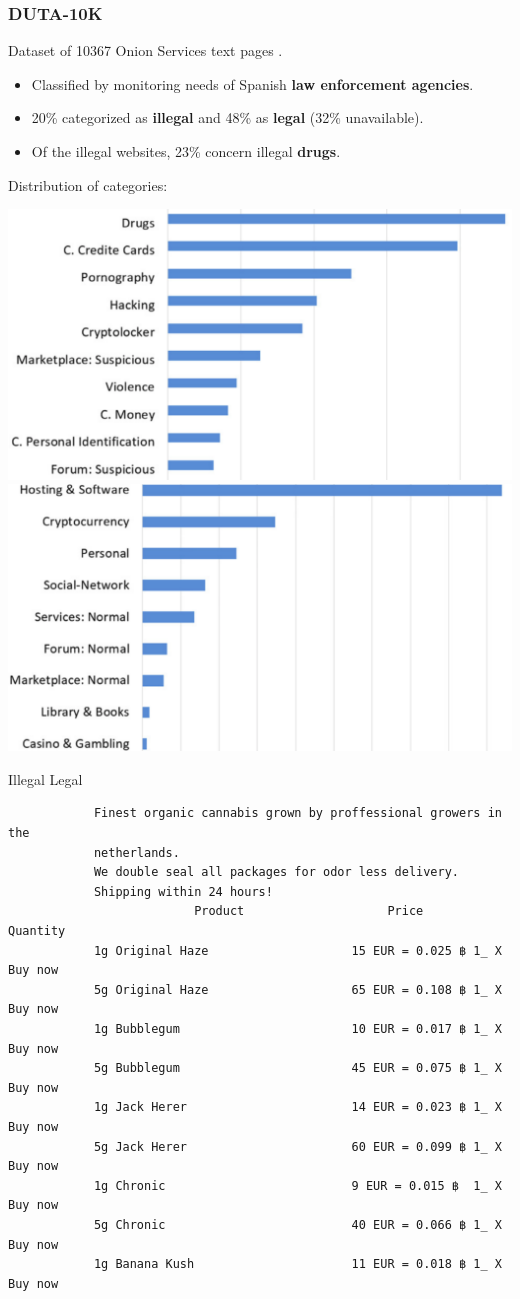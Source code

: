\documentclass[t,xcolor={svgnames,table}]{beamer}
\begin{document}
\begin{frame}
	\frametitle{DUTA-10K}
	
	Dataset of 10367 Onion Services text pages \cite{AlNabki19}.

	\begin{itemize}\setlength\itemsep{1em}
		\item Classified by monitoring needs of Spanish \textbf{law enforcement agencies}.
		\item 20\% categorized as \textbf{illegal} and 48\% as \textbf{legal} (32\% unavailable).
		\item Of the illegal websites, 23\% concern illegal \textbf{drugs}.
	\end{itemize}
	\vfill
	\pause

	Distribution of categories:
	
	\includegraphics[width=.49\textwidth]{suspicious.png}\hfill\includegraphics[width=.49\textwidth]{normal.png}
	
	\hspace{2cm} Illegal \hspace{5cm} Legal
\end{frame}

\begin{frame}[fragile]
	\small
	\begin{center}\color{OwlGreen}
		\begin{verbatim}
			Finest organic cannabis grown by proffessional growers in the
			netherlands.
			We double seal all packages for odor less delivery.
			Shipping within 24 hours!
			              Product                    Price          Quantity
			1g Original Haze                    15 EUR = 0.025 ฿ 1_ X Buy now
			5g Original Haze                    65 EUR = 0.108 ฿ 1_ X Buy now
			1g Bubblegum                        10 EUR = 0.017 ฿ 1_ X Buy now
			5g Bubblegum                        45 EUR = 0.075 ฿ 1_ X Buy now
			1g Jack Herer                       14 EUR = 0.023 ฿ 1_ X Buy now
			5g Jack Herer                       60 EUR = 0.099 ฿ 1_ X Buy now
			1g Chronic                          9 EUR = 0.015 ฿  1_ X Buy now
			5g Chronic                          40 EUR = 0.066 ฿ 1_ X Buy now
			1g Banana Kush                      11 EUR = 0.018 ฿ 1_ X Buy now
		\end{verbatim}
	\end{center}
\end{frame}
\end{document}
